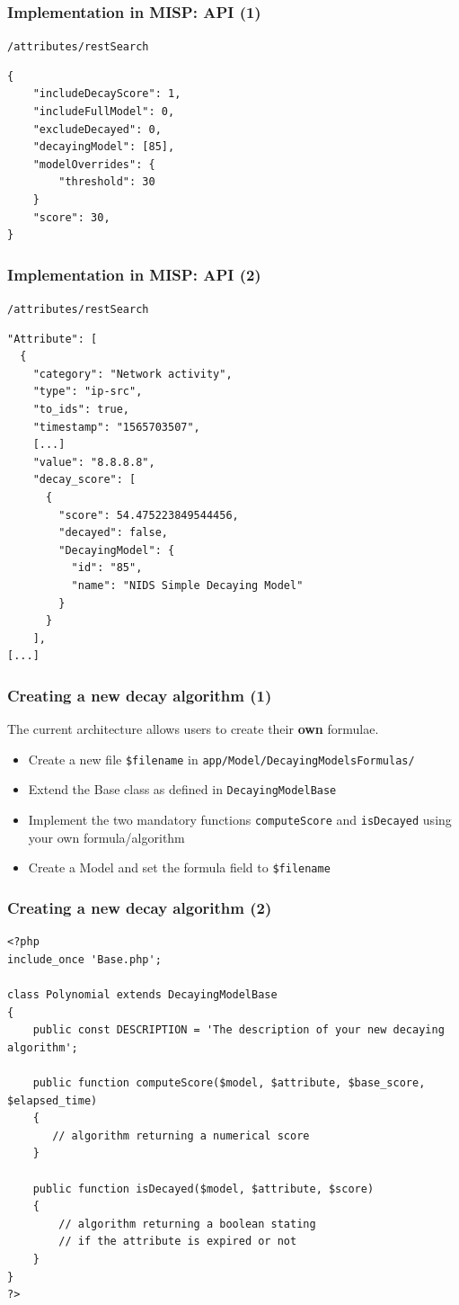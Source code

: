 \begin{frame}[fragile]
    \frametitle{Implementation in MISP: API (1)}
    \texttt{/attributes/restSearch}
    \begin{lstlisting}
{
    "includeDecayScore": 1,
    "includeFullModel": 0,
    "excludeDecayed": 0,
    "decayingModel": [85],
    "modelOverrides": {
        "threshold": 30
    }
    "score": 30,
}
    \end{lstlisting}
\end{frame}

\begin{frame}[fragile]
    \frametitle{Implementation in MISP: API (2)}
    \texttt{/attributes/restSearch}
    \begin{lstlisting}
"Attribute": [
  {
    "category": "Network activity",
    "type": "ip-src",
    "to_ids": true,
    "timestamp": "1565703507",
    [...]
    "value": "8.8.8.8",
    "decay_score": [
      {
        "score": 54.475223849544456,
        "decayed": false,
        "DecayingModel": {
          "id": "85",
          "name": "NIDS Simple Decaying Model"
        }
      }
    ],
[...]
    \end{lstlisting}
\end{frame}

\begin{frame}
    \frametitle{Creating a new decay algorithm (1)}
    The current architecture allows users to create their \textbf{own} formulae.

    \begin{itemize}
        \item Create a new file \texttt{{\$}filename} in \texttt{app/Model/DecayingModelsFormulas/}
        \item Extend the Base class as defined in \texttt{DecayingModelBase}
        \item Implement the two mandatory functions \texttt{computeScore} and \texttt{isDecayed} using your own formula/algorithm
        \item Create a Model and set the formula field to \texttt{{\$}filename}
    \end{itemize}
\end{frame}


\begin{frame}[fragile]
    \frametitle{Creating a new decay algorithm (2)}
    \lstset{basicstyle=\scriptsize}
    \begin{lstlisting}
<?php
include_once 'Base.php';

class Polynomial extends DecayingModelBase
{
    public const DESCRIPTION = 'The description of your new decaying algorithm';

    public function computeScore($model, $attribute, $base_score, $elapsed_time)
    {
       // algorithm returning a numerical score
    }

    public function isDecayed($model, $attribute, $score)
    {
        // algorithm returning a boolean stating
        // if the attribute is expired or not
    }
}
?>
    \end{lstlisting}
\end{frame}
